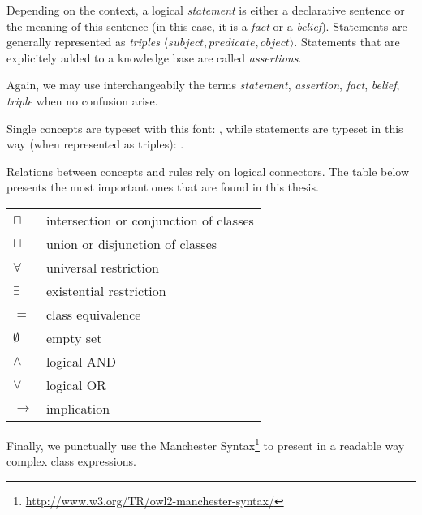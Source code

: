 Depending on the context, a logical \emph{statement} is either a declarative sentence or
the meaning of this sentence (in this case, it is a \emph{fact} or a
\emph{belief}). Statements are generally represented as
\emph{triples} $\langle subject, predicate, object \rangle$. Statements that are
explicitely added to a knowledge base are called \emph{assertions}.

Again, we may use interchangeabily the terms \emph{statement},
\emph{assertion}, \emph{fact}, \emph{belief}, \emph{triple} when no confusion
arise.

Single concepts are typeset with this font: , while statements
are typeset in this way (when represented as triples): .

Relations between concepts and rules rely on logical connectors. The table
below presents the most important ones that are found in this thesis.

\begin{center}
\begin{tabular}{ll}
\toprule
$\sqcap$ & intersection or conjunction of classes \\
$\sqcup$ & union or disjunction of classes \\
$\forall$ & universal restriction \\
$\exists$ & existential restriction \\
$\equiv$ & class equivalence \\
$\emptyset$ & empty set \\
\midrule
$\land$ & logical AND \\
$\lor$ & logical OR \\
$\to$ & implication \\
\bottomrule
\end{tabular}
\end{center}

Finally, we punctually use the Manchester
Syntax\footnote{\url{http://www.w3.org/TR/owl2-manchester-syntax/}} to present
in a readable way complex class expressions.

\clearpage
